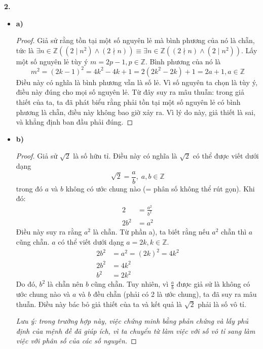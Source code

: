 \documentclass[12pt,a4paper]{article}
\theoremstyle{definition}
\begin{document}
\bigskip
\textbf{2.}
\begin{itemize}
\item \textbf{a)}
\begin{proof}
Giả sử rằng tồn tại một số nguyên lẻ mà bình phương của nó là chẵn, tức là $\exists n \in \mathbb{Z}((2 \mid n^2) \land (2 \nmid n)) \equiv \exists n \in \mathbb{Z}((2 \nmid n) \land (2 \mid n^2))$. Lấy một số nguyên lẻ tùy ý $m = 2p - 1, p \in \mathbb{Z}$. Bình phương của nó là
\[m^2 = (2k - 1)^2 = 4k^2 - 4k + 1 = 2(2k^2 - 2k) + 1 = 2a + 1, a \in \mathbb{Z}\]
Điều này có nghĩa là bình phương vẫn là số lẻ. Vì số nguyên ta chọn là tùy ý, điều này đúng cho mọi số nguyên lẻ. Từ đây suy ra mâu thuẫn: trong giả thiết của ta, ta đã phát biểu rằng phải tồn tại một số nguyên lẻ có bình phương là chẵn, điều này không bao giờ xảy ra. Vì lý do này, giả thiết là sai, và khẳng định ban đầu phải đúng.
\end{proof}

\item \textbf{b)}
\begin{proof}
Giả sử $\sqrt{2}$ là số hữu tỉ. Điều này có nghĩa là $\sqrt{2}$ có thể được viết dưới dạng
\[\sqrt{2} = \frac{a}{b},\; a, b \in \mathbb{Z}\]
trong đó $a$ và $b$ không có ước chung nào (= phân số không thể rút gọn). Khi đó:
\begin{align}
2 &= \frac{a^2}{b^2} \\
2b^2 &= a^2
\end{align}
Điều này suy ra rằng $a^2$ là chẵn. Từ phần a), ta biết rằng nếu $a^2$ chẵn thì $a$ cũng chẵn.
$a$ có thể viết dưới dạng $a = 2k, k \in \mathbb{Z}$.
\begin{align}
2b^2 &= a^2 = (2k)^2 = 4k^2 \\
2b^2 &= 4k^2 \\
b^2 &= 2k^2
\end{align}
Do đó, $b^2$ là chẵn nên $b$ cũng chẵn. Tuy nhiên, vì $\frac{a}{b}$ được giả sử là không có ước chung nào và $a$ và $b$ đều chẵn (phải có 2 là ước chung), ta đã suy ra mâu thuẫn. Điều này bác bỏ giả thiết của ta và kết quả là $\sqrt{2}$ phải là số vô tỉ.

\textit{Lưu ý: trong trường hợp này, việc chứng minh bằng phản chứng và lấy phủ định của mệnh đề đã giúp ích, vì ta chuyển từ làm việc với số vô tỉ sang làm việc với phân số của các số nguyên.}
\end{proof}


\end{itemize}
\end{document}
